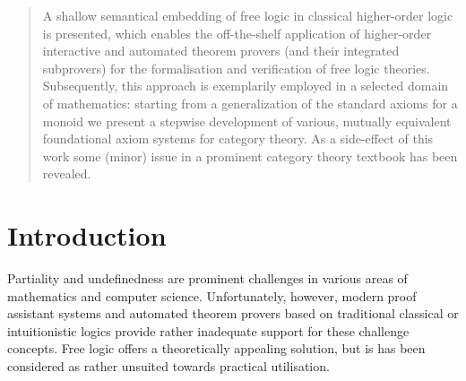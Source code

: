 \begin{abstract}


  A shallow semantical embedding of free logic in classical
  higher-order logic is presented, which enables the off-the-shelf
  application of higher-order interactive and automated theorem
  provers (and their integrated subprovers) for the formalisation and
  verification of free logic theories.  
  Subsequently, this approach is exemplarily employed in a selected domain of
  mathematics: starting from a generalization of the standard axioms
  for a monoid we present a stepwise development of various, mutually
  equivalent foundational axiom systems for category theory. As a
  side-effect of this work some (minor) issue in a prominent category
  theory textbook has been revealed.


\end{abstract}

\section{Introduction}
\label{intro}
Partiality and undefinedness are prominent challenges in various areas
of mathematics and computer science.  Unfortunately, however, modern
proof assistant systems and automated theorem provers based on
traditional classical or intuitionistic logics provide rather
inadequate support for these challenge concepts.  Free logic offers a
theoretically appealing solution, but is has been considered as rather
unsuited towards practical utilisation.


